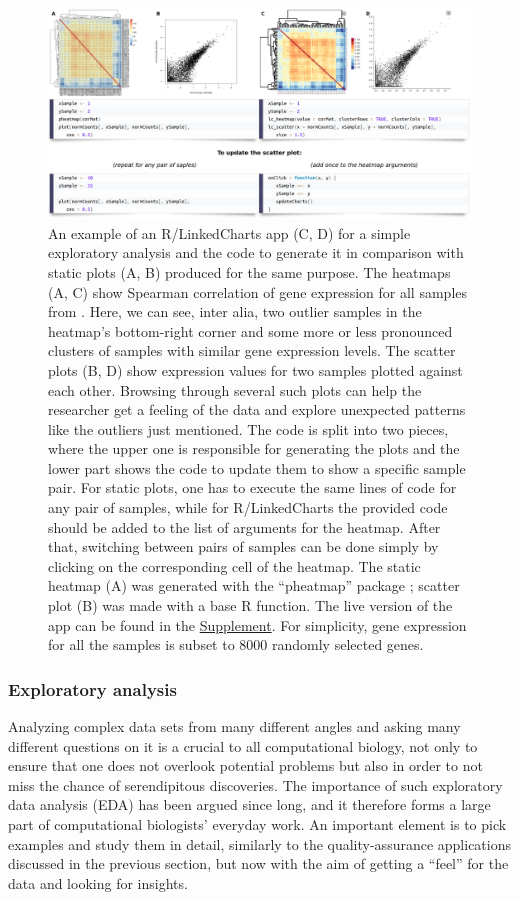 \documentclass[twocolumn,10pt]{article}
\newcommand{\Supplement}{\href{https://anders-biostat.github.io/lc-paper/}{Supplement}}
\begin{document}
\begin{figure}[t]
	\includegraphics[width=\textwidth]{FigE/figE.png}
	\caption{An example of an R/LinkedCharts app (C, D) for a simple exploratory analysis and the code to generate it in comparison with static plots (A, B) produced for the same purpose.  The heatmaps (A, C) show Spearman correlation of gene expression for all samples from \citet{conway_2015}. Here, we can see, inter alia, two outlier samples in the heatmap's bottom-right corner and some more or less pronounced clusters of samples with similar gene expression levels. The scatter plots (B, D) show expression values for two samples plotted against each other. Browsing through several such plots can help the researcher get a feeling of the data and explore unexpected patterns like the outliers just mentioned. The code is split into two pieces, where the upper one is responsible for generating the plots and the lower part shows the code to update them to show a specific sample pair. For static plots, one has to execute the same lines of code for any pair of samples, while for R/LinkedCharts the provided code should be added to the list of arguments for the heatmap. After that, switching between pairs of samples can be done simply by clicking on the corresponding cell of the heatmap. The static heatmap (A) was generated with the ``pheatmap'' package  \citep{kolde_2019}; scatter plot (B) was made with a base R function. The live version of the app can be found in the \Supplement. For simplicity, gene expression for all the samples is subset to 8000 randomly selected genes.}
	\label{FigE}
\end{figure}

\subsubsection{Exploratory analysis}

Analyzing complex data sets from many different angles and asking many different questions on it is a crucial to all computational biology, not only to ensure that one does not overlook potential problems but also in order to not miss the chance of serendipitous discoveries. The importance of such exploratory data analysis (EDA) has been argued since long, and it therefore forms a large part of computational biologists' everyday work. An important element is to pick examples and study them in detail, similarly to the quality-assurance applications discussed in the previous section, but now with the aim of getting a ``feel'' for the data and looking for insights.
\end{document}
